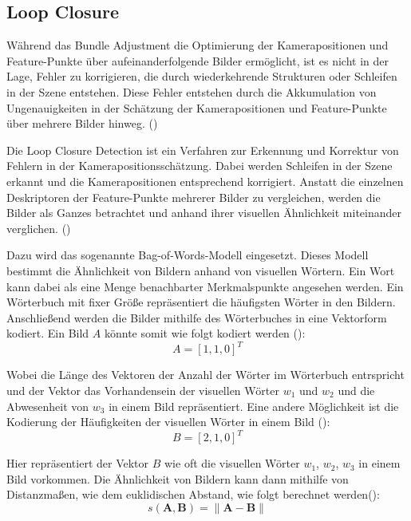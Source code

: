 \subsection{Loop Closure}

Während das Bundle Adjustment die Optimierung der Kamerapositionen und Feature-Punkte über aufeinanderfolgende Bilder ermöglicht, ist es nicht in der Lage, Fehler zu korrigieren, die durch wiederkehrende Strukturen oder Schleifen in der Szene entstehen. Diese Fehler entstehen durch die Akkumulation von Ungenauigkeiten in der Schätzung der Kamerapositionen und Feature-Punkte über mehrere Bilder hinweg. (\cite{gao2021vSLAM, cadena2016slam})

Die Loop Closure Detection ist ein Verfahren zur Erkennung und Korrektur von Fehlern in der Kamerapositionsschätzung. Dabei werden Schleifen in der Szene erkannt und die Kamerapositionen entsprechend korrigiert. Anstatt die einzelnen Deskriptoren der Feature-Punkte mehrerer Bilder zu vergleichen, werden die Bilder als Ganzes betrachtet und anhand ihrer visuellen Ähnlichkeit miteinander verglichen. (\cite{gao2021vSLAM, cadena2016slam})

Dazu wird das sogenannte Bag-of-Words-Modell eingesetzt. Dieses Modell bestimmt die Ähnlichkeit von Bildern anhand von visuellen Wörtern. Ein Wort kann dabei als eine Menge benachbarter Merkmalspunkte angesehen werden. Ein Wörterbuch mit fixer Größe repräsentiert die häufigsten Wörter in den Bildern. Anschließend werden die Bilder mithilfe des Wörterbuches in eine Vektorform kodiert. Ein Bild \( A \) könnte somit wie folgt kodiert werden (\cite{gao2021vSLAM, yoon2024BoW}): 
\begin{equation}
    A = [1, 1, 0]^T
\end{equation}

Wobei die Länge des Vektoren der Anzahl der Wörter im Wörterbuch entrspricht und der Vektor das Vorhandensein der visuellen Wörter \( w_1 \) und \( w_2 \) und die Abwesenheit von \( w_3 \) in einem Bild repräsentiert. Eine andere Möglichkeit ist die Kodierung der Häufigkeiten der visuellen Wörter in einem Bild (\cite{gao2021vSLAM}):
\begin{equation}
    B = [2, 1, 0]^T
\end{equation}

Hier repräsentiert der Vektor \( B \) wie oft die visuellen Wörter \( w_1 \), \( w_2 \), \( w_3 \) in einem Bild vorkommen. Die Ähnlichkeit von Bildern kann dann mithilfe von Distanzmaßen, wie dem euklidischen Abstand, wie folgt berechnet werden(\cite{gao2021vSLAM}):
\begin{equation}
    s(\mathbf{A}, \mathbf{B}) = \|\mathbf{A} - \mathbf{B}\|
\end{equation}

